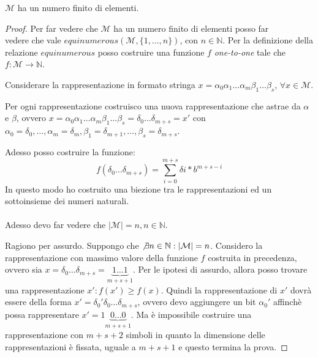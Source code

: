 \begin{exercise}[1.6]
$\mathcal{M}$ ha un numero finito di elementi.
\end{exercise}
\begin{proof}
Per far vedere che $\mathcal{M}$ ha un numero finito di elementi posso far \\
vedere che vale
$equinumerous(\mathcal{M}, \lbrace 1, \ldots, n\rbrace)$, con $n \in \mathbb{N}$.
Per la definizione della relazione $equinumerous$ posso costruire una funzione $f$
\emph{one-to-one} tale che $f: \mathcal{M} \rightarrow \mathbb{N}$.

Considerare la rappresentazione in formato stringa 
$x = \alpha_{0}\alpha_{1}\ldots\alpha_{m}\beta_{1}\ldots\beta_{s}$, $\forall x \in \mathcal{M}$.

Per ogni rappresentazione costruisco una nuova rappresentazione che astrae da $\alpha$ e $\beta$, 
ovvero $x = \alpha_{0}\alpha_{1}\ldots\alpha_{m}\beta_{1}\ldots\beta_{s} = \delta_{0} \ldots 
\delta_{m + s} = x'$
con $\alpha_{0} = \delta_{0}, \ldots, \alpha_{m} = \delta_{m}, \beta_{1} = \delta_{m + 1}, \ldots, 
\beta_{s} = \delta_{m + s}$.

Adesso posso costruire la funzione:
\begin{displaymath}
f(\delta_{0} \ldots \delta_{m + s}) = \sum_{i = 0}^{m + s}{\delta{i} * b^{m + s - i}}
\end{displaymath}
In questo modo ho costruito una biezione tra le rappresentazioni ed un sottoinsieme 
dei numeri naturali. \\\\
Adesso devo far vedere che $|\mathcal{M}| = n, n \in \mathbb{N}$.

Ragiono per assurdo. Suppongo che $\not \exists n \in \mathbb{N}: |\mathcal{M}| = n$.
Considero la rappresentazione con massimo valore della funzione $f$ costruita in precedenza,
ovvero sia $x = \delta_{0} \ldots \delta_{m + s} = \underbrace{1 \ldots 1}_{m+s+1}$.
Per le ipotesi di assurdo, allora posso trovare una rappresentazione $x':f(x') \geq f(x)$.
Quindi la rappresentazione di $x'$ dovr\`a essere della forma $x' = \delta_{0}' \delta_{0} 
\ldots \delta_{m + s}$,
ovvero devo aggiungere un bit $\alpha_{0}'$ affinch\`e possa rappresentare 
$x' = 1 \underbrace{0 \ldots 0}_{m+s+1}$. Ma \`e impossibile costruire una rappresentazione
con $m+s+2$ simboli in quanto la dimensione delle rappresentazioni \`e fissata, uguale a $m+s+1$ 
e questo termina la prova.

\end{proof}

